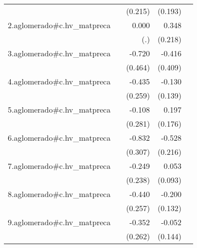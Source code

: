 {\begin{longtable}{l*{4}{D{.}{.}{-1}}}
            &                     &     (0.215)         &     (0.193)         &                     \\
\addlinespace
2.aglomerado#c.hv\_matpreca&                     &       0.000         &       0.348         &                     \\
            &                     &         (.)         &     (0.218)         &                     \\
\addlinespace
3.aglomerado#c.hv\_matpreca&                     &      -0.720         &      -0.416         &                     \\
            &                     &     (0.464)         &     (0.409)         &                     \\
\addlinespace
4.aglomerado#c.hv\_matpreca&                     &      -0.435         &      -0.130         &                     \\
            &                     &     (0.259)         &     (0.139)         &                     \\
\addlinespace
5.aglomerado#c.hv\_matpreca&                     &      -0.108         &       0.197         &                     \\
            &                     &     (0.281)         &     (0.176)         &                     \\
\addlinespace
6.aglomerado#c.hv\_matpreca&                     &      -0.832\sym{**} &      -0.528\sym{*}  &                     \\
            &                     &     (0.307)         &     (0.216)         &                     \\
\addlinespace
7.aglomerado#c.hv\_matpreca&                     &      -0.249         &       0.053         &                     \\
            &                     &     (0.238)         &     (0.093)         &                     \\
\addlinespace
8.aglomerado#c.hv\_matpreca&                     &      -0.440         &      -0.200         &                     \\
            &                     &     (0.257)         &     (0.132)         &                     \\
\addlinespace
9.aglomerado#c.hv\_matpreca&                     &      -0.352         &      -0.052         &                     \\
            &                     &     (0.262)         &     (0.144)         &                     \\

\end{longtable}}
